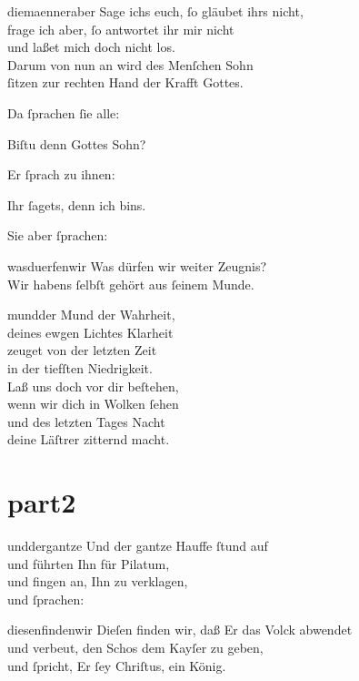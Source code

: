 \documentclass[tocstyle=ref-genre]{ees}
\begin{document}
{\begin{movement}{diemaenneraber}
  \voice[Jesus]
  Sage ichs euch, ſo gläubet ihrs nicht,\\
  frage ich aber, ſo antwortet ihr mir nicht\\
  und laßet mich doch nicht los.\\
  Darum von nun an wird des Menſchen Sohn\\
  ſitzen zur rechten Hand der Krafft Gottes.

  \voice[Evangelist]
  Da ſprachen ſie alle:

  \voice[Chor]
  Biſtu denn Gottes Sohn?

  \voice[Evangelist]
  Er ſprach zu ihnen:

  \voice[Jesus]
  Ihr ſagets, denn ich bins.

  \voice[Evangelist]
  Sie aber ſprachen:
\end{movement}

\begin{movement}{wasduerfenwir}
  \voice[Chor]
  Was dürfen wir weiter Zeugnis?\\
  Wir habens ſelbſt gehört aus ſeinem Munde.
\end{movement}

\begin{movement}{mundder}
  \voice[Alto]
  Mund der Wahrheit,\\
  deines ewgen Lichtes Klarheit\\
  zeuget von der letzten Zeit\\
  in der tiefſten Niedrigkeit.\\
  Laß uns doch vor dir beſtehen,\\
  wenn wir dich in Wolken ſehen\\
  und des letzten Tages Nacht\\
  deine Läſtrer zitternd macht.
\end{movement}


\part{part2}

\begin{movement}{unddergantze}
  \voice[Evangelist]
  Und der gantze Hauffe ſtund auf\\
  und führten Ihn für Pilatum,\\
  und fingen an, Ihn zu verklagen,\\
  und ſprachen:
\end{movement}

\begin{movement}{diesenfindenwir}
  \voice[Chor]
  Dieſen finden wir, daß Er das Volck abwendet\\
  und verbeut, den Schos dem Kayſer zu geben,\\
  und ſpricht, Er ſey Chriſtus, ein König.
\end{movement}

}
\end{document}
